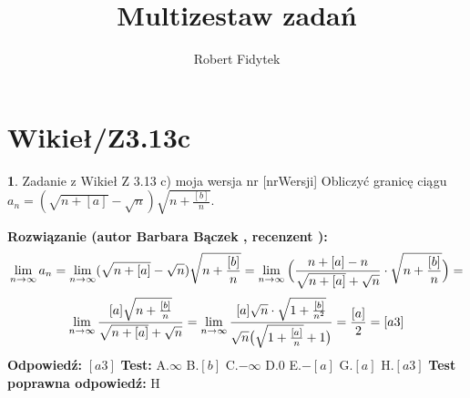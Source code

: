 \documentclass[12pt, a4paper]{article}
\title{Multizestaw zadań}
\author{Robert Fidytek}
\date{}
\theoremstyle{definition} %
\newtheorem{zad}{}
\newcommand{\kategoria}[1]{\section{#1}} %
\newcommand{\zadStart}[1]{\begin{zad}#1\newline} %
\newcommand{\zadStop}{\end{zad}}   %
\newcommand{\rozwStart}[2]{\noindent \textbf{Rozwiązanie (autor #1 , recenzent #2): }\newline} %
\newcommand{\rozwStop}{\newline}                                            %
\newcommand{\odpStart}{\noindent \textbf{Odpowiedź:}\newline}    %
\newcommand{\odpStop}{\newline}                                             %
\newcommand{\testStart}{\noindent \textbf{Test:}\newline} %
\newcommand{\testStop}{\newline} %
\newcommand{\kluczStart}{\noindent \textbf{Test poprawna odpowiedź:}\newline} %
\newcommand{\kluczStop}{\newline} %
\begin{document}
\maketitle


\kategoria{Wikieł/Z3.13c}
\zadStart{Zadanie z Wikieł Z 3.13 c) moja wersja nr [nrWersji]}
Obliczyć granicę ciągu $a_n= (\sqrt{n+[a]}-\sqrt{n})\sqrt{n +\frac{[b]}{n}}$.
\zadStop
\rozwStart{Barbara Bączek}{}
$$\lim_{n \rightarrow \infty} a_n= \lim_{n \rightarrow \infty} (\sqrt{n+[a]}-\sqrt{n})\sqrt{n +\frac{[b]}{n}}= \lim_{n \rightarrow \infty} \Big{(} \frac{n+[a]-n}{\sqrt{n+[a]}+\sqrt{n}} \cdot \sqrt{n +\frac{[b]}{n}} \Big{)}=$$
$$  \lim_{n \rightarrow \infty} \frac{[a]  \sqrt{n +\frac{[b]}{n}}}{\sqrt{n+[a]}+\sqrt{n}}=  \lim_{n \rightarrow \infty} \frac{[a]\sqrt{n} \cdot \sqrt{1+\frac{[b]}{n^2}}}{\sqrt{n}\big{(}\sqrt{1+\frac{[a]}{n}}+1\big{)}}= \frac{[a]}{2}= [a3]$$
\rozwStop
\odpStart
$[a3]$
\odpStop
\testStart
A.$\infty$
B.$[b]$
C.$-\infty$
D.$0$
E.$-[a]$
G.$[a]$
H.$[a3]$
\testStop
\kluczStart
H
\kluczStop
\end{document}
